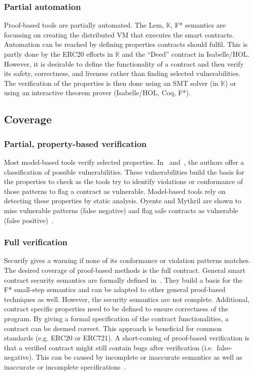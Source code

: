 \subsubsection{Partial automation}
Proof-based tools are partially automated. The Lem, $\mathbb{K}$, F* semantics are focussing on creating the distributed VM that executes the smart contracts. Automation can be reached by defining properties contracts should fulfil. This is partly done by the ERC20 efforts in $\mathbb{K}$ and the ``Deed'' contract in Isabelle/HOL. However, it is desirable to define the functionality of a contract and then verify its safety, correctness, and liveness rather than finding selected vulnerabilities. The verification of the properties is then done using an SMT solver (in $\mathbb{K}$) or using an interactive theorem prover (Isabelle/HOL, Coq, F*).

\subsection{Coverage} 
\subsubsection{Partial, property-based verification}
Most model-based tools verify selected properties. In~\cite{Atzei2017} and~\cite{Luu2016}, the authors offer a classification of possible vulnerabilities. These vulnerabilities build the basis for the properties to check as the tools try to identify violations or conformance of those patterns to flag a contract as vulnerable.
Model-based tools rely on detecting these properties by static analysis. 
Oyente and Mythril are shown to miss vulnerable patterns (false negative) and flag safe contracts as vulnerable (false positive)~\cite{Tsankov2017}.

\subsubsection{Full verification}
Securify gives a warning if none of its conformance or violation patterns matches.
The desired coverage of proof-based methods is the full contract. 
General smart contract security semantics are formally defined in~\cite{Grishchenko2018}. They build a basis for the F* small-step semantics and can be adapted to other general proof-based techniques as well.
However, the security semantics  are not complete.
Additional, contract specific properties need to be defined to ensure correctness of the program.
By giving a formal specification of the contract functionalities, a contract can be deemed correct. This approach is beneficial for common standards (e.g. ERC20 or ERC721). 
A short-coming of proof-based verification is that a verified contract might still contain bugs after verification (i.e.\ false-negative). 
This can be caused by incomplete or inaccurate semantics as well as inaccurate or incomplete specifications~\cite{Hirai2016}.

